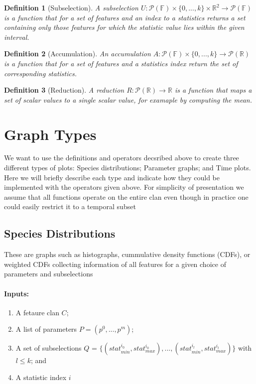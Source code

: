 \documentclass[journal]{vgtc}         %
\def\Rspace{\mathbb{R}} %
\def\Fspace{\mathbb{F}} %
\def\Pset{\mathcal{P}} %
\newtheorem{definition}{Definition}
\begin{document}
\begin{definition}[Subselection]

  A \emph{subselection} $U: \Pset(\Fspace) \times \{0,...,k\} \times \Rspace^2
  \rightarrow \Pset(\Fspace)$ is a function that for a set of features and an
  index to a statistics returns a set containing only those features for which
  the statistic value lies within the given interval.

\end{definition}

\begin{definition}[Accumulation]

  An \emph{accumulation} $A: \Pset(\Fspace) \times \{0,...,k\} \rightarrow
  \Pset(\Rspace)$ is a function that for a set of features and a statistics
  index return the set of corresponding statistics.

\end{definition}

\begin{definition}[Reduction]

  A \emph{reduction} $R: \Pset(\Rspace) \rightarrow \Rspace$ is a function that
  maps a set of scalar values to a single scalar value, for examaple by
  computing the mean.

\end{definition}

\section{Graph Types}

We want to use the definitions and operators decsribed above to create three
different types of plots: Species distributions; Parameter graphs; and Time
plots. Here we will briefly describe each type and indicate how they could be
implemented with the operators given above. For simplicity of presentation we
assume that all functions operate on the entire clan even though in practice one
could easily restrict it to a temporal subset

\subsection{Species Distributions}

These are graphs such as histographs, cummulative density functions (CDFs), or
weighted CDFs collecting information of all features for a given choice of
parameters and subselections

\paragraph{Inputs:} 
\begin{enumerate}
\item A fetaure clan $C$;
\item A list of parameters $P = (p^0,...,p^m)$; 
\item A set of subselections $Q$ = $\{(stat_{min}^{i_0},stat_{max}^{i_0}), ... ,
  (stat_{min}^{i_l},stat_{max}^{i_l})\}$ with $l \le k$; and
\item A statistic index $i$
\end{enumerate}
\end{document}
